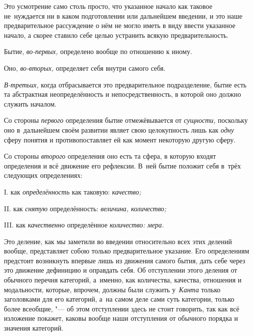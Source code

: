 Это усмотрение само столь просто, что указанное начало как таковое
не~нуждается ни в каком подготовлении или дальнейшем введении, и это наше
предварительное рассуждение о нём не могло иметь в виду ввести указанное
начало, а скорее ставило себе целью устранить всякую предварительность.


Бытие, {\em во-первых,} определено вообще по отношению к иному.

Оно, {\em во-вторых,} определяет себя внутри самого себя.

{\em В-третьих,} когда отбрасывается это предварительное
подразделение, бытие есть та абстрактная неопределённость и
непосредственность, в которой оно должно служить началом.

Со стороны {\em первого} определения бытие отмежёвывается от {\em сущности,}
поскольку оно в~дальнейшем своём развитии являет свою целокупность лишь как
{\em одну} сферу понятия и противопоставляет ей как момент
некоторую другую сферу.

Со стороны {\em второго} определения оно есть та сфера, в которую входят
определения и всё движение его рефлексии. В~ней бытие положит себя в~трёх
следующих определениях:

I. как {\em определённость} как таковую: {\em качество;}

II. как {\em снятую} определённость: {\em величина, количество;}

III. как {\em качественно} определённое {\em количество: мера.}

Это деление, как мы заметили во введении относительно всех этих делений вообще,
представляет собою только предварительное указание. Его определениям предстоит
возникнуть впервые лишь из движения самого бытия, дать себе через это движение
дефиницию и оправдать себя. Об отступлении этого деления от обычного перечня
категорий, а~именно, как количества, качества, отношения и модальности,
которые, впрочем, должны были служить у~{\em Канта} только заголовками для его
категорий, а~на самом деле сами суть категории, только более всеобщие, "--- об
этом отступлении здесь не стоит говорить, так как всё изложение покажет, каковы
вообще наши отступления от обычного порядка и значения категорий.

